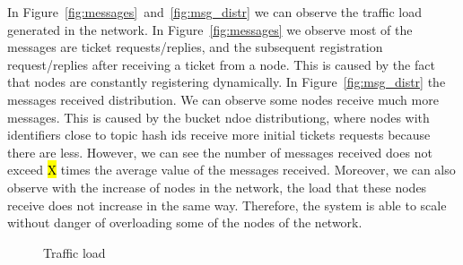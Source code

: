 
In Figure~\ref{fig:messages}~and~\ref{fig:msg_distr} we can observe the traffic load generated in the network.
In Figure~\ref{fig:messages} we observe most of the messages are ticket requests/replies, and the subsequent registration request/replies
after receiving a ticket from a node. 
This is caused by the fact that nodes are constantly registering dynamically. 
In Figure~\ref{fig:msg_distr} the messages received distribution. 
We can observe some nodes receive much more messages.
This is caused by the bucket ndoe distributiong, where nodes with identifiers close to topic hash ids receive more initial tickets requests because there are less.
However, we can see the number of messages received does not exceed \hl{X} times the average value of the messages received. 
Moreover, we can also observe with the increase of nodes in the network, the load that these nodes receive does not increase in the same way. 
Therefore, the system is able to scale without danger of overloading some of the nodes of the network.

\begin{figure}[!h]
\centering
{} 
\hspace{-0.25cm}
 \caption{Traffic load} 
\label{fig:traffic}
\vspace{-0.15in}
\end{figure}   

